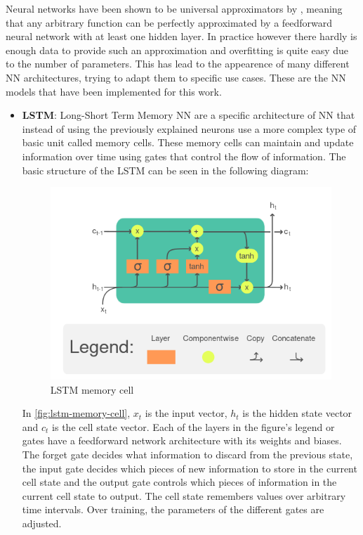 Neural networks have been shown to be universal approximators by \cite{hornik_stinchcombe_white_1989}, meaning that any arbitrary function can be perfectly approximated by a feedforward neural network with at least one hidden layer. In practice however there hardly is enough data to provide such an approximation and overfitting is quite easy due to the number of parameters. This has lead to the appearence of many different NN architectures, trying to adapt them to specific use cases. These are the NN models that have been implemented for this work. 
\begin{itemize}
    \item \textbf{LSTM}: Long-Short Term Memory NN are a specific architecture of NN that instead of using the previously explained neurons use a more complex type of basic unit called memory cells. These memory cells can maintain and update information over time using gates that control the flow of information. The basic structure of the LSTM can be seen in the following diagram:
    \begin{figure}[ht]
        \centering
        \captionsetup{justification=centering}
        \includegraphics[width=0.7\linewidth]{assets/LSTM_Cell.png}
        \caption{LSTM memory cell}
        \label{fig:lstm-memory-cell}
    \end{figure}
    In \autoref{fig:lstm-memory-cell}, $x_t$ is the input vector, $h_t$ is the hidden state vector and $c_t$ is the cell state vector. Each of the layers in the figure's legend or gates have a feedforward network architecture with its weights and biases. The forget gate decides what information to discard from the previous state, the input gate decides which pieces of new information to store in the current cell state and the output gate controls which pieces of information in the current cell state to output. The cell state remembers values over arbitrary time intervals. Over training, the parameters of the different gates are adjusted. 


\end{itemize}
